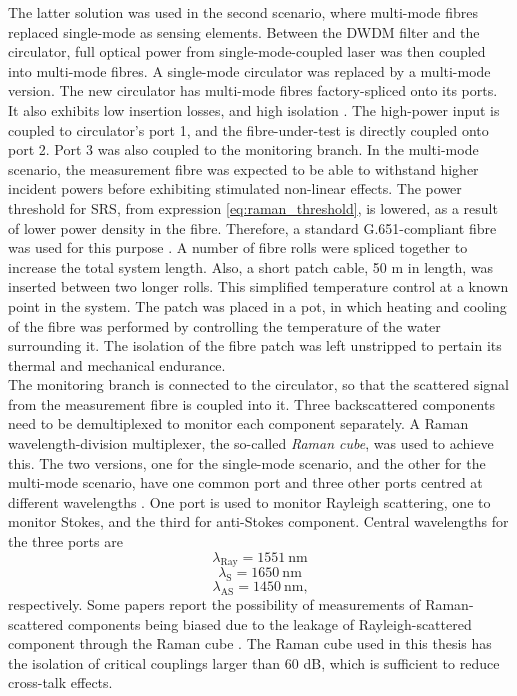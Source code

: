 \documentclass{standalone}
\begin{document}
The latter solution was used in the second scenario, where multi-mode fibres replaced single-mode as sensing elements. Between the DWDM filter and the circulator, full optical power from single-mode-coupled laser was then coupled into multi-mode fibres. A single-mode circulator was replaced by a multi-mode version. The new circulator has multi-mode fibres factory-spliced onto its ports. It also exhibits low insertion losses, and high isolation \cite{datasheet:mmf_circulator}. The high-power input is coupled to circulator's port 1, and the fibre-under-test is directly coupled onto port 2. Port 3 was also coupled to the monitoring branch. In the multi-mode scenario, the measurement fibre was expected to be able to withstand higher incident powers before exhibiting stimulated non-linear effects. The power threshold for SRS, from expression \ref{eq:raman_threshold}, is lowered, as a result of lower power density in the fibre. Therefore, a standard G.651-compliant fibre was used for this purpose \cite{G651}. A number of fibre rolls were spliced together to increase the total system length. Also, a short patch cable, 50 m in length, was inserted between two longer rolls. This simplified temperature control at a known point in the system. The patch was placed in a pot, in which heating and cooling of the fibre was performed by controlling the temperature of the water surrounding it. The isolation of the fibre patch was left unstripped to pertain its thermal and mechanical endurance. \\

The monitoring branch is connected to the circulator, so that the scattered signal from the measurement fibre is coupled into it. Three backscattered components need to be demultiplexed to monitor each component separately. A Raman wavelength-division multiplexer, the so-called \textit{Raman cube}, was used to achieve this. The two versions, one for the single-mode scenario, and the other for the multi-mode scenario, have one common port and three other ports centred at different wavelengths \cite{datasheet:raman_smf}\cite{datasheet:raman_mmf}. One port is used to monitor Rayleigh scattering, one to monitor Stokes, and the third for anti-Stokes component. Central wavelengths for the three ports are
\begin{equation}
\lambda_\textrm{Ray} = \SI{1551}{\nano \meter}
\end{equation}
\begin{equation}
\lambda_\textrm{S} = \SI{1650}{\nano \meter}
\end{equation}
\begin{equation}
\lambda_\textrm{AS} = \SI{1450}{\nano \meter} \textrm{,}
\end{equation}
respectively. Some papers report the possibility of measurements of Raman-scattered components being biased due to the leakage of Rayleigh-scattered component through the Raman cube \cite{rayleigh_leakage1}\cite{rayleigh_leakage2}. The Raman cube used in this thesis has the isolation of critical couplings larger than 60 dB, which is sufficient to reduce cross-talk effects. \\
\end{document}
